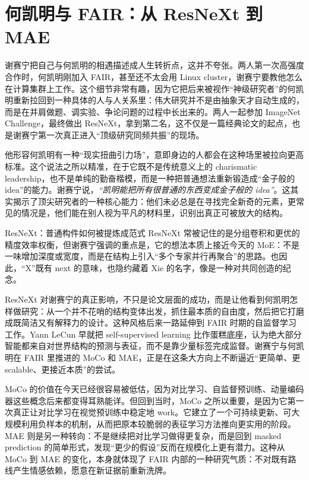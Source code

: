 \section{何凯明与 FAIR：从 ResNeXt 到 MAE}

谢赛宁把自己与何凯明的相遇描述成人生转折点，这并不夸张。两人第一次高强度合作时，何凯明刚加入 FAIR，甚至还不太会用 Linux cluster，谢赛宁要教他怎么在计算集群上工作。这个细节非常有趣，因为它把后来被视作“神级研究者”的何凯明重新拉回到一种具体的人与人关系里：伟大研究并不是由抽象天才自动生成的，而是在并肩做题、调实验、争论问题的过程中长出来的。两人一起参加 ImageNet Challenge，最终做出 ResNeXt，拿到第二名，这不仅是一篇经典论文的起点，也是谢赛宁第一次真正进入“顶级研究同频共振”的现场。

他形容何凯明有一种“现实扭曲引力场”，意即身边的人都会在这种场里被拉向更高标准。这个说法之所以精准，在于它既不是传统意义上的 charismatic leadership，也不是单纯的勤奋楷模，而是一种把普通想法重新锻造成“金子般的 idea”的能力。谢赛宁说，\textit{``凯明能把所有很普通的东西变成金子般的 idea''}。这其实揭示了顶尖研究者的一种核心能力：他们未必总是在寻找完全新奇的元素，更常见的情况是，他们能在别人视为平凡的材料里，识别出真正可被放大的结构。

\begin{importantbox}{ResNeXt：普通构件如何被提炼成范式}
ResNeXt 常被记住的是分组卷积和更优的精度效率权衡，但谢赛宁强调的重点是，它的想法本质上接近今天的 MoE：不是一味增加深度或宽度，而是在结构上引入“多个专家并行再聚合”的思路。也因此，“X”既有 next 的意味，也隐约藏着 Xie 的名字，像是一种对共同创造的纪念。
\end{importantbox}

ResNeXt 对谢赛宁的真正影响，不只是论文层面的成功，而是让他看到何凯明怎样做研究：从一个并不花哨的结构变体出发，抓住最本质的自由度，然后把它打磨成既简洁又有解释力的设计。这种风格后来一路延伸到 FAIR 时期的自监督学习工作。Yann LeCun 早就把 self-supervised learning 比作蛋糕底座，认为绝大部分智能都来自对世界结构的预测与表征，而不是靠少量标签完成监督。谢赛宁与何凯明在 FAIR 里推进的 MoCo 和 MAE，正是在这条大方向上不断逼近“更简单、更 scalable、更接近本质”的尝试。

MoCo 的价值在今天已经很容易被低估，因为对比学习、自监督预训练、动量编码器这些概念后来都变得耳熟能详。但回到当时，MoCo 之所以重要，是因为它第一次真正让对比学习在视觉预训练中稳定地 work。它建立了一个可持续更新、可大规模利用负样本的机制，从而把原本较脆弱的表征学习方法推向更实用的阶段。MAE 则是另一种转向：不是继续把对比学习做得更复杂，而是回到 masked prediction 的简单形式，发现“更少的假设”反而在规模化上更有潜力。这种从 MoCo 到 MAE 的变化，本身就体现了 FAIR 内部的一种研究气质：不对既有路线产生情感依赖，愿意在新证据前重新洗牌。

